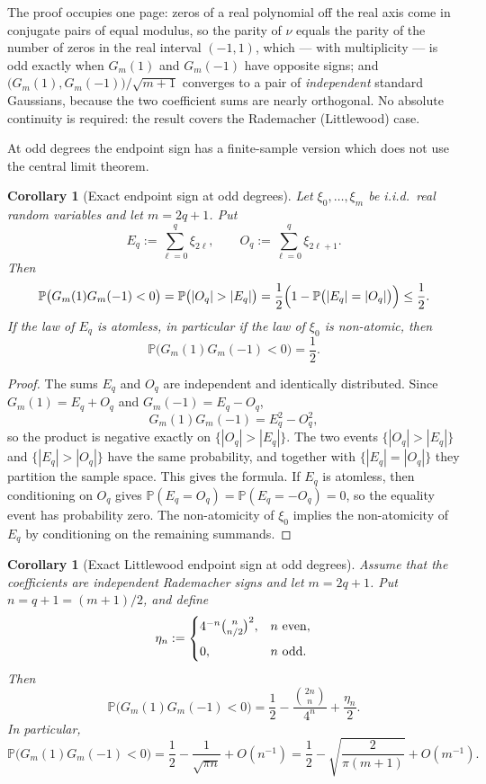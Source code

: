 \documentclass[11pt]{article}
\newtheorem{corollary}[theorem]{Corollary}
\newcommand{\PP}{\mathbb{P}}
\begin{document}
The proof occupies one page: zeros of a real polynomial off the real axis come in
conjugate pairs of equal modulus, so the parity of $\nu$ equals the parity of the
number of zeros in the real interval $(-1,1)$, which --- with multiplicity ---
is odd exactly when $G_m(1)$ and $G_m(-1)$ have opposite signs; and
$\bigl(G_m(1),G_m(-1)\bigr)/\sqrt{m+1}$ converges to a pair of \emph{independent}
standard Gaussians, because the two coefficient sums are nearly orthogonal.  No
absolute continuity is required: the result covers the Rademacher (Littlewood)
case.

At odd degrees the endpoint sign has a finite-sample version which does not use
the central limit theorem.

\begin{corollary}[Exact endpoint sign at odd degrees]\label{cor:odd-endpoint}
Let $\xi_0,\dots,\xi_m$ be i.i.d.\ real random variables and let
$m=2q+1$.  Put
\[
E_q:=\sum_{\ell=0}^{q}\xi_{2\ell},
\qquad
O_q:=\sum_{\ell=0}^{q}\xi_{2\ell+1}.
\]
Then
\[
\PP\bigl(G_m(1)G_m(-1)<0\bigr)
=\PP\bigl(|O_q|>|E_q|\bigr)
=\frac12\Bigl(1-\PP\bigl(|E_q|=|O_q|\bigr)\Bigr)
\le \frac12.
\]
If the law of $E_q$ is atomless, in particular if the law of $\xi_0$ is
non-atomic, then
\[
\PP\bigl(G_m(1)G_m(-1)<0\bigr)=\frac12.
\]
\end{corollary}

\begin{proof}
The sums $E_q$ and $O_q$ are independent and identically distributed.  Since
$G_m(1)=E_q+O_q$ and $G_m(-1)=E_q-O_q$,
\[
G_m(1)G_m(-1)=E_q^2-O_q^2,
\]
so the product is negative exactly on $\{|O_q|>|E_q|\}$.  The two events
$\{|O_q|>|E_q|\}$ and $\{|E_q|>|O_q|\}$ have the same probability, and together
with $\{|E_q|=|O_q|\}$ they partition the sample space.  This gives the formula.
If $E_q$ is atomless, then conditioning on $O_q$ gives
$\PP(E_q=O_q)=\PP(E_q=-O_q)=0$, so the equality event has probability zero.  The
non-atomicity of $\xi_0$ implies the non-atomicity of $E_q$ by conditioning on
the remaining summands.
\end{proof}

\begin{corollary}[Exact Littlewood endpoint sign at odd degrees]\label{cor:littlewood-odd}
Assume that the coefficients are independent Rademacher signs and let
\(m=2q+1\).  Put \(n=q+1=(m+1)/2\), and define
\[
  \eta_n:=
  \begin{cases}
  4^{-n}\binom{n}{n/2}^{2},& n\ {\rm even},\\[2mm]
  0,& n\ {\rm odd}.
  \end{cases}
\]
Then
\[
\PP\bigl(G_m(1)G_m(-1)<0\bigr)
=\frac12-\frac{\binom{2n}{n}}{4^n}+\frac{\eta_n}{2}.
\]
In particular,
\[
\PP\bigl(G_m(1)G_m(-1)<0\bigr)
=\frac12-\frac{1}{\sqrt{\pi n}}+O(n^{-1})
=\frac12-\sqrt{\frac{2}{\pi(m+1)}}+O(m^{-1}).
\]
\end{corollary}
\end{document}
